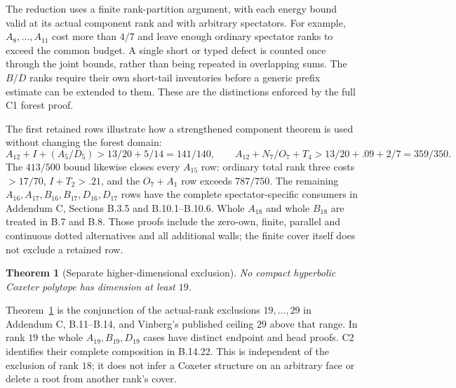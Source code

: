 \documentclass[11pt]{article}
\newtheorem{theorem}{Theorem}[section]
\theoremstyle{remark}\newtheorem{remark}[theorem]{Remark}
\numberwithin{equation}{section}
\begin{document}
The reduction uses a finite rank-partition argument, with each energy
bound valid at its actual component rank and with arbitrary spectators.
For example, $A_8,\ldots,A_{11}$ cost more than $4/7$ and leave enough
ordinary spectator ranks to exceed the common budget. A single short or
typed defect is counted once through the joint bounds, rather than being
repeated in overlapping sums. The $B/D$ ranks require their own short-tail
inventories before a generic prefix estimate can be extended to them.
These are the distinctions enforced by the full C1 forest proof.

The first retained rows illustrate how a strengthened component theorem
is used without changing the forest domain:
\[
 A_{12}+I+(A_5/D_5)>13/20+5/14=141/140,
 \qquad
 A_{12}+N_7/O_7+T_4>13/20+.09+2/7=359/350.
\]
The $413/500$ bound likewise closes every $A_{15}$ row: ordinary total
rank three costs $>17/70$, $I+T_2>.21$, and the $O_7+A_1$ row exceeds
$787/750$. The remaining $A_{16},A_{17},B_{16},B_{17},D_{16},D_{17}$
rows have the complete spectator-specific consumers in Addendum C,
Sections B.3.5 and B.10.1--B.10.6. Whole $A_{18}$ and whole $B_{18}$
are treated in B.7 and B.8. Those proofs include the zero-own, finite,
parallel and continuous dotted alternatives and all additional walls;
the finite cover itself does not exclude a retained row.

\begin{theorem}[Separate higher-dimensional exclusion]
\label{compact:thm:tail}
No compact hyperbolic Coxeter polytope has dimension at least $19$.
\end{theorem}
Theorem~\ref{compact:thm:tail} is the conjunction of the actual-rank
exclusions $19,\ldots,29$ in Addendum C, B.11--B.14, and Vinberg's
published ceiling $29$ above that range. In rank $19$ the whole
$A_{19},B_{19},D_{19}$ cases have distinct endpoint and head proofs.
C2 identifies their complete composition in B.14.22. This is independent
of the exclusion of rank $18$; it does not infer a Coxeter structure on
an arbitrary face or delete a root from another rank's cover.
\end{document}

